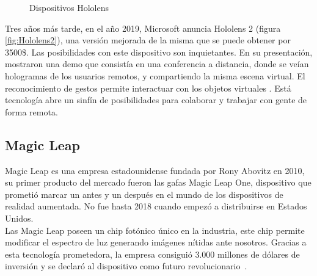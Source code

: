 \begin{figure}[H]
\centering
{}
\caption[Dispositivos Hololens]{Dispositivos Hololens\footnotemark}\label{fig:hololens}
\end{figure}
 
Tres años más tarde, en el año 2019, Microsoft anuncia Hololens 2 (figura \ref{fig:Hololens2}), una versión mejorada de la misma que se puede obtener por 3500\$. Las posibilidades con este dispositivo son inquietantes. En su presentación, mostraron una demo que consistía en una conferencia a distancia, donde se veían hologramas de los usuarios remotos, y compartiendo la misma escena virtual. El reconocimiento de gestos permite interactuar con los objetos virtuales \cite{holovideo}. Está tecnología abre un sinfín de posibilidades para colaborar y trabajar con gente de forma remota.

\subsection{Magic Leap}
Magic Leap es una empresa estadounidense fundada por Rony Abovitz en 2010, su primer producto del mercado fueron las gafas Magic Leap One, dispositivo que prometió marcar un antes y un después en el mundo de los dispositivos de realidad aumentada. No fue hasta 2018 cuando empezó a distribuirse en Estados Unidos.\\

Las Magic Leap poseen un chip fotónico único en la industria, este chip permite modificar el espectro de luz generando imágenes nítidas ante nosotros. Gracias a esta tecnología prometedora, la empresa consiguió 3.000 millones de dólares de inversión y se declaró al dispositivo como futuro revolucionario~\cite{MagicLeap_AB}.\\


